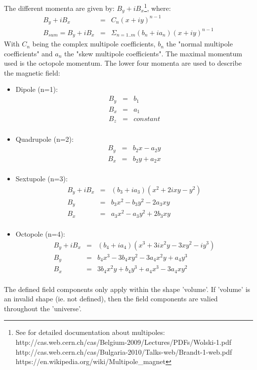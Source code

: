 \documentclass[10pt,a4paper]{article}
\begin{document}
The different momenta are given by:  $ B_y + i  B_x $\footnote{
See for detailed documentation about multipoles:\\
http://cas.web.cern.ch/cas/Belgium-2009/Lectures/PDFs/Wolski-1.pdf \\
http://cas.web.cern.ch/cas/Bulgaria-2010/Talks-web/Brandt-1-web.pdf \\
https://en.wikipedia.org/wiki/Multipole\_magnet
}, where:
\begin{eqnarray*}
         B_y + i B_x &=& C_n (x + iy)^{n-1}                         \\
B_{sum} = B_y + i B_x &=& \Sigma_{n=1..m} (b_n + ia_n) (x + iy)^{n-1}
\end{eqnarray*}
With $C_n$ being the complex multipole coefficients,
$b_n$ the "normal multipole coefficients" and $a_n$ the "skew multipole coefficients".
The maximal momentum used is the octopole momentum. The lower four momenta are used
to describe the magnetic field:
\begin{itemize}\itemcompact
\item Dipole (n=1):
    \begin{eqnarray*}
        B_y &=& b_1                                       \\
        B_x &=& a_1                                       \\
        B_z &=& constant                                  \\
    \end{eqnarray*}
\item Quadrupole (n=2):
    \begin{eqnarray*}
        B_y &=& b_2 x - a_2 y                             \\
        B_x &=& b_2 y + a_2 x                             \\
    \end{eqnarray*}
\item Sextupole (n=3):
    \begin{eqnarray*}
        B_y + i B_x &=& (b_3 +ia_3) (x^2 + 2ixy - y^2)    \\
        B_y         &=& b_3 x^2 - b_3 y^2 - 2 a_3 xy      \\
        B_x         &=& a_3 x^2 - a_3 y^2 + 2 b_3 xy      \\
    \end{eqnarray*}

\item Octopole (n=4):
    \begin{eqnarray*}
        B_y + i B_x &=& (b_4 +ia_4) (x^3 + 3ix^2y - 3xy^2 -iy^3)  \\
        B_y &=& b_4 x^3 - 3 b_4 x y^2 - 3 a_4 x^2 y + a_4 y^3     \\
        B_x &=& 3 b_4 x^2 y + b_4 y^3 + a_4 x^3 - 3 a_4 x y^2     \\
    \end{eqnarray*}
\end{itemize}
The defined field components only apply within the shape 'volume'.
If 'volume' is an invalid shape (ie. not defined), then the field
components are valied throughout the 'universe'.
\end{document}
